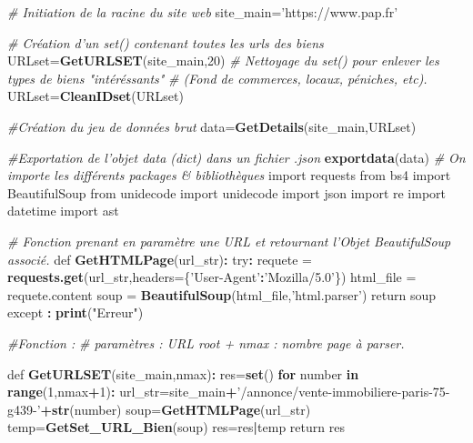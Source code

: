 \documentclass[french,]{article}
\newenvironment{Shaded}{\begin{snugshade}}{\end{snugshade}}
\newcommand{\CommentTok}[1]{\textcolor[rgb]{0.56,0.35,0.01}{\textit{#1}}}
\newcommand{\ControlFlowTok}[1]{\textcolor[rgb]{0.13,0.29,0.53}{\textbf{#1}}}
\newcommand{\DataTypeTok}[1]{\textcolor[rgb]{0.13,0.29,0.53}{#1}}
\newcommand{\DecValTok}[1]{\textcolor[rgb]{0.00,0.00,0.81}{#1}}
\newcommand{\KeywordTok}[1]{\textcolor[rgb]{0.13,0.29,0.53}{\textbf{#1}}}
\newcommand{\NormalTok}[1]{#1}
\newcommand{\OperatorTok}[1]{\textcolor[rgb]{0.81,0.36,0.00}{\textbf{#1}}}
\newcommand{\StringTok}[1]{\textcolor[rgb]{0.31,0.60,0.02}{#1}}
\begin{document}
\begin{Shaded}
\begin{Highlighting}[]
\CommentTok{# Initiation de la racine du site web}
\NormalTok{site_main=}\StringTok{'https://www.pap.fr'}

\CommentTok{# Création d'un set() contenant toutes les urls des biens}
\NormalTok{URLset=}\KeywordTok{GetURLSET}\NormalTok{(site_main,}\DecValTok{20}\NormalTok{)}
\CommentTok{# Nettoyage du set() pour enlever les types de biens "intéréssants"}
\CommentTok{# (Fond de commerces, locaux, péniches, etc).}
\NormalTok{URLset=}\KeywordTok{CleanIDset}\NormalTok{(URLset)}

\CommentTok{#Création du jeu de données brut}
\NormalTok{data=}\KeywordTok{GetDetails}\NormalTok{(site_main,URLset)}

\CommentTok{#Exportation de l'objet data (dict) dans un fichier .json }
\KeywordTok{exportdata}\NormalTok{(data)  }
\CommentTok{# On importe les différents packages & bibliothèques}
\NormalTok{import requests}
\NormalTok{from bs4 import BeautifulSoup }
\NormalTok{from unidecode import unidecode}
\NormalTok{import json}
\NormalTok{import re}
\NormalTok{import datetime}
\NormalTok{import ast}


\CommentTok{# Fonction prenant en paramètre une URL et retournant l'Objet BeautifulSoup associé.}
\NormalTok{def }\KeywordTok{GetHTMLPage}\NormalTok{(url_str)}\OperatorTok{:}
\StringTok{    }\NormalTok{try}\OperatorTok{:}
\StringTok{        }\NormalTok{requete =}\StringTok{ }\KeywordTok{requests.get}\NormalTok{(url_str,}\DataTypeTok{headers=}\NormalTok{\{}\StringTok{'User-Agent'}\OperatorTok{:}\StringTok{'Mozilla/5.0'}\NormalTok{\})}
\NormalTok{        html_file  =}\StringTok{ }\NormalTok{requete.content}
\NormalTok{        soup =}\StringTok{ }\KeywordTok{BeautifulSoup}\NormalTok{(html_file,}\StringTok{'html.parser'}\NormalTok{)}
\NormalTok{        return soup}
\NormalTok{    except }\OperatorTok{:}
\StringTok{        }\KeywordTok{print}\NormalTok{(}\StringTok{"Erreur"}\NormalTok{)}

\CommentTok{#Fonction :}
\CommentTok{# paramètres : URL root +  nmax : nombre page à parser. }

\NormalTok{def }\KeywordTok{GetURLSET}\NormalTok{(site_main,nmax)}\OperatorTok{:}
\StringTok{    }\NormalTok{res=}\KeywordTok{set}\NormalTok{()}
    \ControlFlowTok{for}\NormalTok{ number }\ControlFlowTok{in} \KeywordTok{range}\NormalTok{(}\DecValTok{1}\NormalTok{,nmax}\OperatorTok{+}\DecValTok{1}\NormalTok{)}\OperatorTok{:}
\StringTok{        }\NormalTok{url_str=site_main}\OperatorTok{+}\StringTok{'/annonce/vente-immobiliere-paris-75-g439-'}\OperatorTok{+}\KeywordTok{str}\NormalTok{(number)}
\NormalTok{        soup=}\KeywordTok{GetHTMLPage}\NormalTok{(url_str)}
\NormalTok{        temp=}\KeywordTok{GetSet_URL_Bien}\NormalTok{(soup)}
\NormalTok{        res=res}\OperatorTok{|}\NormalTok{temp}
\NormalTok{    return res}



\end{Highlighting}
\end{Shaded}
\end{document}
